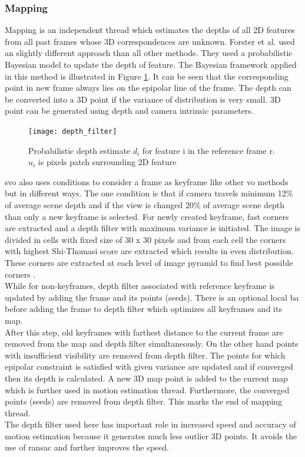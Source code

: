 \subsubsection{Mapping}
Mapping is an independent thread which estimates the depths of all 2D features from all past frames whose 3D correspondences are unknown. Forster et al.\cite{Forster2014ICRA} used an slightly different approach than all other methods. They used a probabilistic Bayesian model to update the depth of feature. The Bayesian framework applied in this method is illustrated in Figure \ref{fig:depth_filter}. It can be seen that the corresponding point in new frame always lies on the epipolar line of the frame. The depth can be converted into a 3D point if the variance of distribution is very small. 3D point can be generated using depth and camera intrinsic parameters. \\
\begin{figure}[H]
	\centering
	\texttt{[image: depth\_filter]}
	\caption{Probabilistic depth estimate $ d_{i} $ for feature i in the reference frame r. $u_{i} $ is pixels patch surrounding 2D feature \cite{Forster2014ICRA} }
	\label{fig:depth_filter}
\end{figure}
\noindent \acrshort{svo} also uses conditions to consider a frame as keyframe like other \acrshort{vo} methods but in different ways. The one condition is that if camera travels minimum 12\% of average scene depth and if the view is changed 20\% of average scene depth than only a new keyframe is selected. For newly created keyframe, \acrshort{fast} corners are extracted and a depth filter with maximum variance is initiated. The image is divided in cells with fixed size of 30 x 30 pixels and from each cell the corners with highest Shi-Thomasi \cite{Shi} score are extracted which results in even distribution. These corners are extracted at each level of image pyramid to find best possible corners \cite{Forster2014ICRA}.\\
\newline While for non-keyframes, depth filter associated with reference keyframe is updated by adding the frame and its points (seeds). There is an optional local \acrshort{ba} before adding the frame to depth filter which optimizes all keyframes and its map.\\
\newline After this step, old keyframes with farthest distance to the current frame are removed from the map and depth filter simultaneously. On the other hand points with insufficient visibility are removed from depth filter. The points for which epipolar constraint is satisfied with given variance are updated and if converged then its depth is calculated. A new 3D map point is added to the current map which is further used in motion estimation thread. Furthermore, the converged points (seeds) are removed from depth filter. This marks the end of mapping thread.\\
\newline The depth filter used here has important role in increased speed and accuracy of motion estimation because it generates much less outlier 3D points. It avoids the use of \acrshort{ransac} and further improves the speed. 

